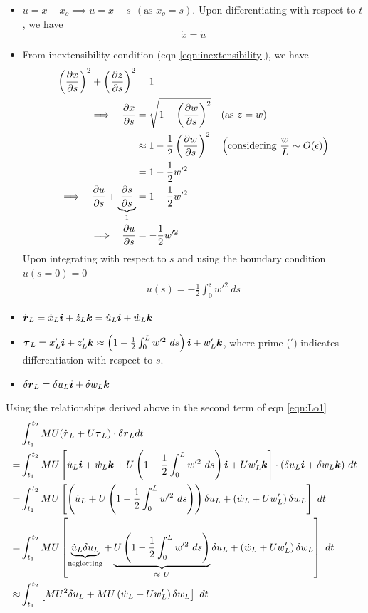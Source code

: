 \documentclass[12pt]{report}
\begin{document}
\begin{itemize}
\item $u = x - x_o \implies u = x - s ~~(\text{as } x_o = s)$. 
 Upon differentiating with respect to $t$, we have
   $$\dot{x} = \dot{u}$$
 
 \item From inextensibility condition (eqn \ref{eqn:inextensibility}), we have
     \begin{align*}
        \left(\pdv{x}{s}\right)^2 + \left(\pdv{z}{s}\right)^2 &= 1\\
    \implies ~~ \pdv{x}{s} &= \sqrt{1 - \left(\pdv{w}{s}\right)^2} \quad (\text{as } z = w) \\
           &\approx 1 - \frac{1}{2}\left(\pdv{w}{s}\right)^2 \quad \left(\text{considering } \frac{w}{L}\sim O(\epsilon)\right)\\
           &= 1 - \frac{1}{2}w'^2 \\
      \implies ~~ \pdv{u}{s} + \underbrace{\pdv{s}{s}}_{1} &= 1 - \frac{1}{2}w'^2  \\
      \implies~~ \pdv{u}{s} &=  - \frac{1}{2}w'^2
     \end{align*}
     Upon integrating with respect to $s$ and using the boundary condition $u(s=0) = 0$
     \begin{align*}
        u(s) = - \frac{1}{2} \int_0^s w'^2 ~ds
     \end{align*}
    \item $\dot{\vb*{r}}_L = \dot{x}_L \vb*{i} + \dot{z}_L \vb*{k} = \dot{u}_L \vb*{i} + \dot{w}_L \vb*{k} $
    
    \item $\vb*{\tau}_L = x_L' \vb*{i} + z_L'\vb*{k} \approx \left(1 - \frac{1}{2}\int_0^L w'^2~ds\right) \vb*{i} + w_L' \vb*{k}$, where prime ($'$) indicates differentiation with respect to $s$.
    \item $\delta \vb*{r}_L = \delta u_L \vb*{i} + \delta w_L \vb*{k}$
\end{itemize}
Using the relationships derived above in the second term of eqn \ref{eqn:Lo1} 
\begin{align*}
 & \int_{t_1}^{t_2}  MU (\dot{\vb*{r}}_L + U\vb*{\tau}_L)\cdot \delta\vb*{r}_L  dt \\
 =& \int_{t_1}^{t_2} MU \left[\dot{u}_L \vb*{i} + \dot{w}_L \vb*{k} + U\left(1 - \frac{1}{2}\int_0^L w'^2~ds\right) \vb*{i} + Uw_L' \vb*{k}\right]\cdot (\delta u_L \vb*{i} + \delta w_L \vb*{k})~dt \\
 =&\int_{t_1}^{t_2} MU \left[\left(\dot{u}_L + U\left(1 - \frac{1}{2}\int_0^L w'^2~ds\right)\right)\delta u_L + \left(\dot{w}_L + Uw_L'\right)\delta w_L\right]~dt \\
 =& \int_{t_1}^{t_2}MU\left[ \underbrace{\dot{u}_L\delta u_L}_{\text{neglecting}} + \underbrace{U\left(1 - \frac{1}{2}\int_0^L w'^2~ds\right)}_{\approx ~U}\delta u_L + \left(\dot{w}_L + Uw_L'\right)\delta w_L\right]~dt \\
  \approx&  \int_{t_1}^{t_2}\left[ MU^2\delta u_L + MU\left(\dot{w}_L + Uw_L'\right)\delta w_L\right]~dt
\end{align*}
\end{document}

